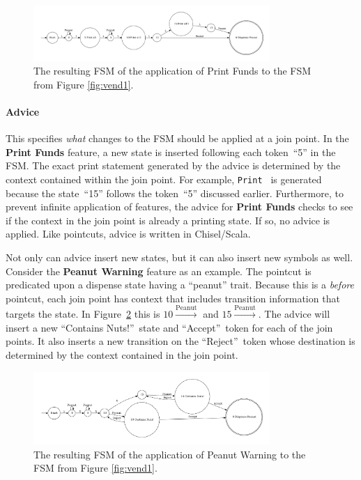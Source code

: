 \documentclass[sigplan,anonymous,review]{acmart}
\begin{document}
\begin{figure}
    \centering
    \includegraphics[width=0.8\textwidth]{figures/vend2.pdf}
    \caption{The resulting FSM of the application of Print Funds to the FSM from Figure \ref{fig:vend1}.}
    \label{fig:applyadvice}
\end{figure}

\paragraph{Advice} This specifies \emph{what} changes to the FSM should be applied at a join point. In the \textbf{Print Funds} feature, a new state is inserted following each token~``5'' in the FSM. The exact print statement generated by the advice is determined by the context contained within the join point. For example, \texttt{Print } is generated because the state~``15'' follows the token~``5'' discussed earlier. Furthermore, to prevent infinite application of features, the advice for \textbf{Print Funds} checks to see if the context in the join point is already a printing state. If so, no advice is applied. Like pointcuts, advice is written in Chisel/Scala. 

Not only can advice insert new states, but it can also insert new symbols as well. Consider the \textbf{Peanut Warning} feature as an example. The pointcut is predicated upon a dispense state having a ``peanut'' trait. Because this is a \emph{before} pointcut, each join point has context that includes transition information that targets the state. In Figure~\ref{fig:applyadvice2} this is $10 \xrightarrow{\text{Peanut}}$ and $15 \xrightarrow{\text{Peanut}}$. The advice will insert a new ``Contains Nuts!''~state and ``Accept''~token for each of the join points. It also inserts a new transition on the ``Reject''~token whose destination is determined by the context contained in the join point.

\begin{figure}
    \centering
    \includegraphics[width=0.8\textwidth]{figures/vend3.pdf}
    \caption{The resulting FSM of the application of Peanut Warning to the FSM from Figure \ref{fig:vend1}.}
    \label{fig:applyadvice2}
\end{figure}
\end{document}
